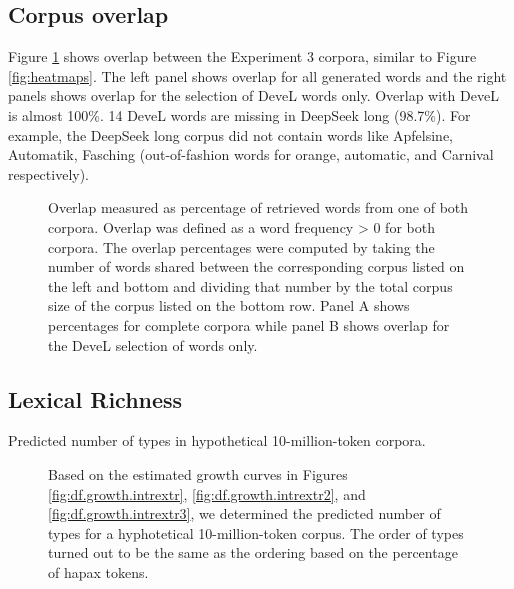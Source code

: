 \documentclass[manuscript]{stjour}
\begin{document}
\clearpage  

\subsection{Corpus overlap}

Figure \ref{fig:heatmaps-exp3} shows overlap between the Experiment 3 corpora, similar to Figure \ref{fig:heatmaps}. The left panel shows overlap for all generated words and the right panels shows overlap for the selection of DeveL words only. Overlap with DeveL is almost 100\%. 14 DeveL words are missing in DeepSeek long (98.7\%). For example, the DeepSeek long corpus
did not contain words like Apfelsine, Automatik, Fasching (out-of-fashion words for orange, automatic, and Carnival respectively).

\begin{figure}[!htbp]
    \caption{Overlap measured as percentage of retrieved words from one of both corpora. Overlap was defined as a word frequency > 0 for both corpora. The overlap percentages were computed by taking the number of words shared between the corresponding corpus listed on the left and bottom and dividing that number by the total corpus size of the corpus listed on the bottom row. Panel A shows percentages for complete corpora while panel B shows overlap for the DeveL selection of words only.}
    \label{fig:heatmaps-exp3}
\end{figure}

\clearpage

\subsection{Lexical Richness}

Predicted number of types in hypothetical 10-million-token corpora.
        
\begin{figure}[!htbp]
    \caption{Based on the estimated growth curves in Figures \ref{fig:df.growth.intrextr}, \ref{fig:df.growth.intrextr2}, and \ref{fig:df.growth.intrextr3}, we determined the predicted number of types for a hyphotetical 10-million-token corpus. The order of types turned out to be the same as the ordering based on the percentage of hapax tokens.}
    \label{fig:zipfR_extrapolation}
  \hfill
\end{figure}

\clearpage  
\end{document}
